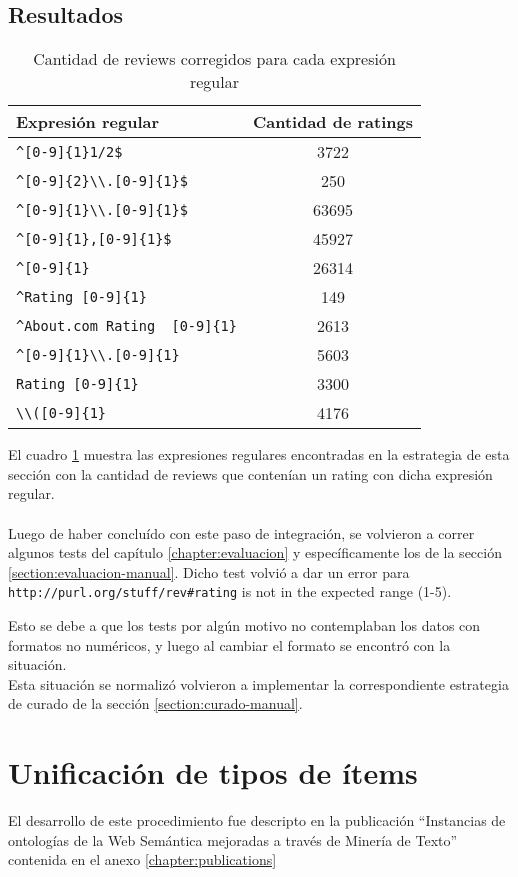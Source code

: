  \subsection*{Resultados}
 \begin{table}[h]
 \begin{tabular}{| l | c |}\hline
 Expresión regular & Cantidad de ratings \\\hline
 \verb|^[0-9]{1}1/2$| & 3722\\
 \verb|^[0-9]{2}\\.[0-9]{1}$| & 250\\
 \verb|^[0-9]{1}\\.[0-9]{1}$| & 63695\\
 \verb|^[0-9]{1},[0-9]{1}$| & 45927\\
 \verb|^[0-9]{1} | & 26314\\
 \verb|^Rating [0-9]{1}| & 149\\
 \verb|^About.com Rating  [0-9]{1}| & 2613\\
 \verb|^[0-9]{1}\\.[0-9]{1} | & 5603\\
 \verb|Rating [0-9]{1}| & 3300\\
 \verb|\\([0-9]{1} | & 4176 \\\hline
 \end{tabular}
 \caption{Cantidad de reviews corregidos para cada expresión regular}
\label{table:RegExpressionsRatingCorrected}
\end{table}
 El cuadro \ref{table:RegExpressionsRatingCorrected} muestra las expresiones regulares encontradas en la estrategia de esta sección con 
 la cantidad de reviews que contenían un rating con dicha expresión regular.
 \\\\
 Luego de haber concluído con este paso de integración, se volvieron a correr algunos tests del capítulo \ref{chapter:evaluacion} y 
 específicamente los de la sección \ref{section:evaluacion-manual}. Dicho test volvió a dar un error para 
 \verb |http://purl.org/stuff/rev#rating| is not in the expected range (1-5).
 
 Esto se debe a que los tests por algún motivo no contemplaban los datos con formatos no numéricos, y luego al cambiar el formato 
 se encontró con la situación.\\
 Esta situación se normalizó volvieron a implementar la correspondiente estrategia de curado de la sección \ref{section:curado-manual}.
 
 \section{Unificación de tipos de ítems}
\label{section:unificacion-items}

El desarrollo de este procedimiento fue descripto en la publicación  “Instancias de ontologías de la Web Semántica mejoradas a través de Minería de Texto” contenida en el anexo \ref{chapter:publications} 